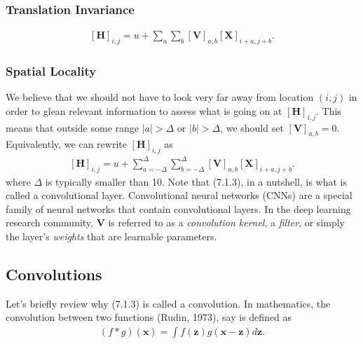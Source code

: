 \documentclass[a4paper,12pt]{article}
\theoremstyle{definition}
\begin{document}
\subsubsection*{Translation Invariance}
\begin{equation*}
    \begin{aligned}
        [\mathbf{H}]_{i, j} = u + \sum_a\sum_b [\mathbf{V}]_{a, b}  [\mathbf{X}]_{i+a, j+b}.
    \end{aligned}
\end{equation*}

\subsubsection*{Spatial Locality}
We believe that we should not have to look very far away from location $(i, j)$ in order to glean relevant information to assess what is going on at $[\mathbf{H}]_{i, j}$.
This means that outside some range $|a|> \Delta$ or $|b| > \Delta$, we should set $[\mathbf{V}]_{a, b} = 0$. Equivalently, we can rewrite $[\mathbf{H}]_{i, j}$ as
\begin{equation}
    \begin{aligned}
        [\mathbf{H}]_{i, j} = u + \sum_{a = -\Delta}^{\Delta} \sum_{b = -\Delta}^{\Delta} [\mathbf{V}]_{a, b}  [\mathbf{X}]_{i+a, j+b}.
    \end{aligned}
\end{equation}
where $\Delta$ is typically smaller than 10. Note that (7.1.3), in a nutshell, is what is called a convolutional layer. Convolutional neural networks (CNNs) are a special
family of neural networks that contain convolutional layers. In the deep learning research community, $\mathbf{V}$ is referred to as a \emph{convolution kernel}, a \emph{filter},
or simply the layer's \emph{weights} that are learnable parameters.

\subsection*{Convolutions}
Let's briefly review why (7.1.3) is called a convolution. In mathematics, the convolution between two functions (Rudin, 1973), say
is defined as
\begin{equation*}
    \begin{aligned}
        (f * g)(\mathbf{x}) = \int f(\mathbf{z}) g(\mathbf{x}-\mathbf{z}) d\mathbf{z}.
    \end{aligned}
\end{equation*}
\end{document}
